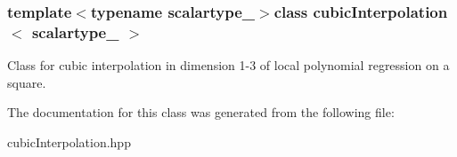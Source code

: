 \subsubsection*{template$<$typename scalartype\+\_\+$>$class cubic\+Interpolation$<$ scalartype\+\_\+ $>$}

Class for cubic interpolation in dimension 1-\/3 of local polynomial regression on a square. 

The documentation for this class was generated from the following file\+:\begin{DoxyCompactItemize}
\item 
cubic\+Interpolation.\+hpp\end{DoxyCompactItemize}
